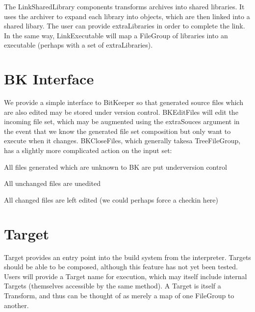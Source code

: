 The LinkSharedLibrary components transforms archives into shared libraries. It uses the archiver to expand each library
into objects, which are then linked into a shared libary. The user can provide extraLibraries in order to complete the
link. In the same way, LinkExecutable will map a FileGroup of libraries into an executable (perhaps with a set of
extraLibraries).

\section{BK Interface}

We provide a simple interface to BitKeeper so that generated source files which are also edited may be stored under
version control. BKEditFiles will edit the incoming file set, which may be augmented using the extraSouces argument in
the event that we know the generated file set composition but only want to execute when it changes. BKCloseFiles, which
generally takesa TreeFileGroup, has a slightly more complicated action on the input set:
\begin{\itemize}
  \item All files generated which are unknown to BK are put underversion control
  \item All unchanged files are unedited
  \item All changed files are left edited (we could perhaps force a checkin here)
\end{\itemize}

\section{Target}

Target provides an entry point into the build system from the interpreter. Targets should be able to be composed,
although this feature has not yet been tested. Users will provide a Target name for execution, which may itself include
internal Targets (themselves accessible by the same method). A Target is itself a Transform, and thus can be thought of
as merely a map of one FileGroup to another.
